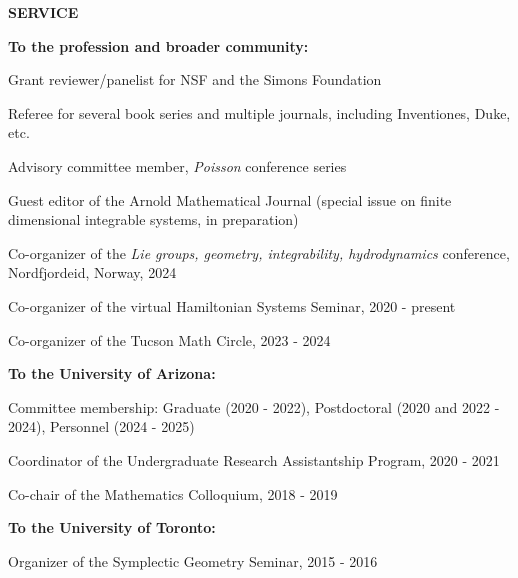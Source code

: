 \documentclass[a4paper, 12pt]{article}
\begin{document}
\textbf{SERVICE} \par\smallskip
\textbf{To the profession and broader community:}
\begin{compactitem}
\item Grant reviewer/panelist for NSF and the Simons Foundation
\item Referee for several book series and multiple journals, including Inventiones, Duke, etc.
\item Advisory committee member, \emph{Poisson} conference series
\item Guest editor of the Arnold Mathematical Journal (special issue on finite dimensional integrable systems, in preparation)
\item Co-organizer of the \emph{Lie groups, geometry, integrability, hydrodynamics} conference, Nordfjordeid, Norway, 2024
\item Co-organizer of the virtual Hamiltonian Systems Seminar, 2020 - present
\item Co-organizer of the Tucson Math Circle, 2023 - 2024
\end{compactitem}
 \par\smallskip
\textbf{To the University of Arizona:}
\begin{compactitem}
\item Committee membership: Graduate (2020 - 2022),  Postdoctoral (2020 and 2022 - 2024), Personnel (2024 - 2025)
\item Coordinator of the Undergraduate Research Assistantship Program, 2020 - 2021
\item Co-chair of the {Mathematics Colloquium}, 2018 - 2019
\end{compactitem}
 \par\smallskip
\textbf{To the University of Toronto:}
\begin{compactitem}
\item Organizer of the {Symplectic Geometry Seminar}, 2015 - 2016
\end{compactitem}
\end{document}
